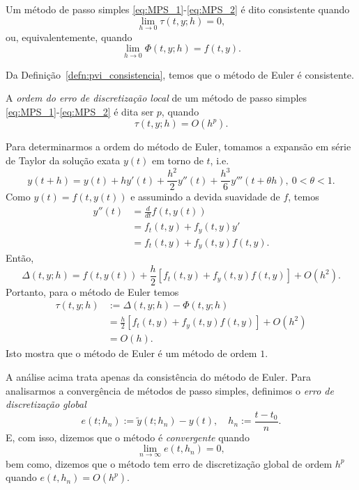\begin{defn}\label{defn:pvi_consistencia}
  Um método de passo simples \eqref{eq:MPS_1}-\eqref{eq:MPS_2} é dito consistente quando
  \begin{equation}
    \lim_{h\to 0}\tau(t,y;h) = 0,
  \end{equation}
ou, equivalentemente, quando
\begin{equation}
  \lim_{h\to 0} \Phi(t,y;h) = f(t,y).
\end{equation}
\end{defn}

\begin{obs}
  Da Definição~\ref{defn:pvi_consistencia}, temos que o método de Euler é consistente.
\end{obs}

A \emph{ordem do erro de discretização local} de um método de passo simples \eqref{eq:MPS_1}-\eqref{eq:MPS_2} é dita ser $p$, quando
\begin{equation}
  \tau(t,y;h) = O(h^p).
\end{equation}

Para determinarmos a ordem do método de Euler, tomamos a expansão em série de Taylor da solução exata $y(t)$ em torno de $t$, i.e.
\begin{equation}
  y(t+h) = y(t) + hy'(t) + \frac{h^2}{2}y''(t) + \frac{h^3}{6}y'''(t+\theta h), ~0<\theta<1.
\end{equation}
Como $y(t)=f(t,y(t))$ e assumindo a devida suavidade de $f$, temos
\begin{align}
  y''(t) &= \frac{d}{dt}f(t,y(t)) \\
         &= f_t(t,y) + f_y(t,y)y'\\
         &= f_t(t,y) + f_y(t,y)f(t,y).
\end{align}
Então,
\begin{equation}\label{eq:pvi_delta_aux}
  \Delta(t,y;h) = f(t,y(t)) + \frac{h}{2}[f_t(t,y) + f_y(t,y)f(t,y)] + O(h^2).
\end{equation}
Portanto, para o método de Euler temos
\begin{align}
  \tau(t,y;h) &:= \Delta(t,y;h)-\Phi(t,y;h)\\
              &= \frac{h}{2}[f_t(t,y) + f_y(t,y)f(t,y)] + O(h^2)\\
              &= O(h).
\end{align}
Isto mostra que o método de Euler é um método de ordem $1$.

A análise acima trata apenas da consistência do método de Euler. Para analisarmos a convergência de métodos de passo simples, definimos o \emph{erro de discretização global}
\begin{equation}
  e(t;h_n) := \tilde{y}(t;h_n) - y(t),\quad h_n := \frac{t-t_0}{n}.
\end{equation}
E, com isso, dizemos que o método é \emph{convergente} quando
\begin{equation}
  \lim_{n\to \infty} e(t,h_n) = 0,
\end{equation}
bem como, dizemos que o método tem erro de discretização global de ordem $h^p$ quando $e(t,h_n) = O(h^p)$.

